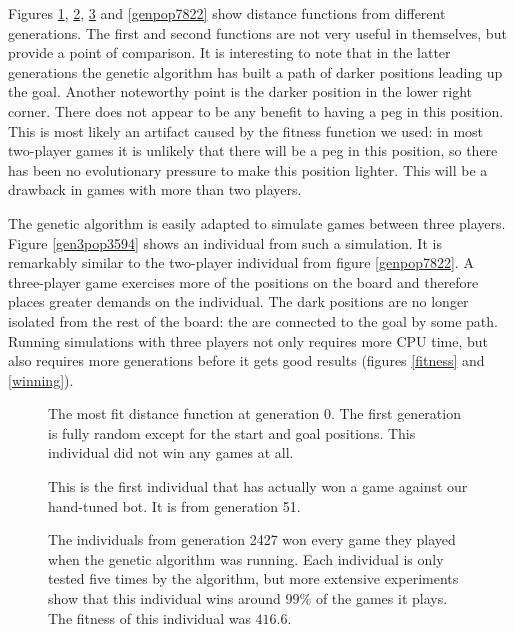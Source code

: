 \documentclass[a4paper,11pt]{article}
\begin{document}
Figures \ref{genpop0}, \ref{genpop51}, \ref{genpop2427} and
\ref{genpop7822} show distance functions from different generations.
The first and second functions are not very useful in themselves, but
provide a point of comparison. It is interesting to note that in the
latter generations the genetic algorithm has built a path of darker
positions leading up the goal. Another noteworthy point is the darker
position in the lower right corner. There does not appear to be any
benefit to having a peg in this position. This is most likely an
artifact caused by the fitness function we used: in most two-player
games it is unlikely that there will be a peg in this position, so
there has been no evolutionary pressure to make this position lighter.
This will be a drawback in games with more than two players.

The genetic algorithm is easily adapted to simulate games between
three players. Figure \ref{gen3pop3594} shows an individual from such
a simulation. It is remarkably similar to the two-player individual
from figure \ref{genpop7822}. A three-player game exercises more of
the positions on the board and therefore places greater demands on the
individual. The dark positions are no longer isolated from the rest of
the board: the are connected to the goal by some path. Running
simulations with three players not only requires more CPU time, but
also requires more generations before it gets good results (figures
\ref{fitness} and \ref{winning}).

\begin{figure}
\centering

\caption{The most fit distance function at generation 0. The first
  generation is fully random except for the start and goal positions.
  This individual did not win any games at all.}
\label{genpop0}
\end{figure}

\begin{figure}
\centering

\caption{This is the first individual that has actually won a game
  against our hand-tuned bot. It is from generation 51.}
\label{genpop51}
\end{figure}

\begin{figure}
\centering

\caption{The individuals from generation 2427 won every game they
  played when the genetic algorithm was running. Each individual is
  only tested five times by the algorithm, but more extensive
  experiments show that this individual wins around $99\%$ of the
  games it plays. The fitness of this individual was $416.6$.}
\label{genpop2427}
\end{figure}
\end{document}
